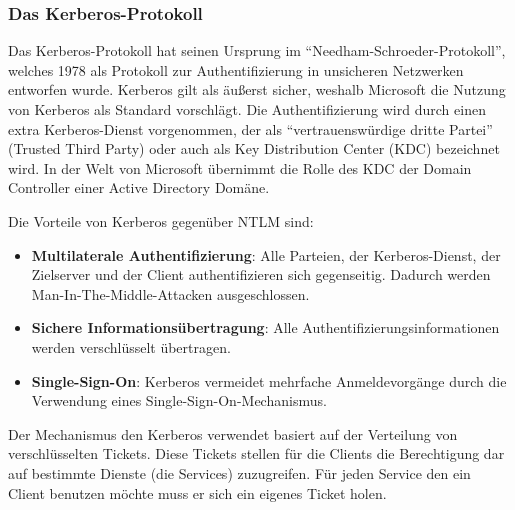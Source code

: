         \subsubsection{Das Kerberos-Protokoll}
          Das Kerberos-Protokoll hat seinen Ursprung im
          \enquote{Needham-Schroeder-Protokoll}, welches 1978 als Protokoll zur
          Authentifizierung in unsicheren Netzwerken entworfen wurde. Kerberos
          gilt als äußerst sicher, weshalb Microsoft die Nutzung von Kerberos
          als Standard vorschlägt. Die Authentifizierung wird durch einen extra
          Kerberos-Dienst vorgenommen, der als \enquote{vertrauenswürdige dritte
          Partei} (Trusted Third Party) oder auch als Key Distribution Center
          (KDC) bezeichnet wird. In der Welt von Microsoft übernimmt die Rolle
          des KDC der Domain Controller einer Active Directory Domäne.
          
          Die Vorteile von Kerberos gegenüber NTLM sind:
          \begin{itemize}
            \item \textbf{Multilaterale Authentifizierung}: Alle Parteien, der
            Kerberos-Dienst, der Zielserver und der Client authentifizieren sich
            gegenseitig. Dadurch werden Man-In-The-Middle-Attacken
            ausgeschlossen.
            \item \textbf{Sichere Informationsübertragung}: Alle
            Authentifizierungsinformationen werden verschlüsselt übertragen.
            \item \textbf{Single-Sign-On}: Kerberos vermeidet mehrfache
            Anmeldevorgänge durch die Verwendung eines
            Single-Sign-On-Mechanismus.
          \end{itemize}
           Der Mechanismus den Kerberos verwendet basiert auf der Verteilung von
           verschlüsselten Tickets. Diese Tickets stellen für die Clients die
           Berechtigung dar auf bestimmte Dienste (die Services) zuzugreifen.
           Für jeden Service den ein Client benutzen möchte muss er sich ein eigenes
           Ticket holen.
           
